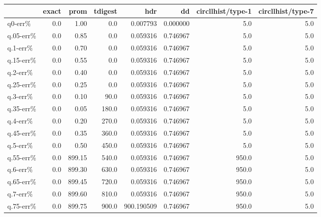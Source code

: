\begin{tabular}{lrrrrrrr}
\toprule
{} &  exact &    prom &  tdigest &         hdr &        dd &  circllhist/type-1 &  circllhist/type-7 \\
\midrule
q0-err\%   &    0.0 &    1.00 &      0.0 &    0.007793 &  0.000000 &                5.0 &                5.0 \\
q.05-err\% &    0.0 &    0.85 &      0.0 &    0.059316 &  0.746967 &                5.0 &                5.0 \\
q.1-err\%  &    0.0 &    0.70 &      0.0 &    0.059316 &  0.746967 &                5.0 &                5.0 \\
q.15-err\% &    0.0 &    0.55 &      0.0 &    0.059316 &  0.746967 &                5.0 &                5.0 \\
q.2-err\%  &    0.0 &    0.40 &      0.0 &    0.059316 &  0.746967 &                5.0 &                5.0 \\
q.25-err\% &    0.0 &    0.25 &      0.0 &    0.059316 &  0.746967 &                5.0 &                5.0 \\
q.3-err\%  &    0.0 &    0.10 &     90.0 &    0.059316 &  0.746967 &                5.0 &                5.0 \\
q.35-err\% &    0.0 &    0.05 &    180.0 &    0.059316 &  0.746967 &                5.0 &                5.0 \\
q.4-err\%  &    0.0 &    0.20 &    270.0 &    0.059316 &  0.746967 &                5.0 &                5.0 \\
q.45-err\% &    0.0 &    0.35 &    360.0 &    0.059316 &  0.746967 &                5.0 &                5.0 \\
q.5-err\%  &    0.0 &    0.50 &    450.0 &    0.059316 &  0.746967 &                5.0 &                5.0 \\
q.55-err\% &    0.0 &  899.15 &    540.0 &    0.059316 &  0.746967 &              950.0 &                5.0 \\
q.6-err\%  &    0.0 &  899.30 &    630.0 &    0.059316 &  0.746967 &              950.0 &                5.0 \\
q.65-err\% &    0.0 &  899.45 &    720.0 &    0.059316 &  0.746967 &              950.0 &                5.0 \\
q.7-err\%  &    0.0 &  899.60 &    810.0 &    0.059316 &  0.746967 &              950.0 &                5.0 \\
q.75-err\% &    0.0 &  899.75 &    900.0 &  900.190509 &  0.746967 &              950.0 &                5.0 \\

\end{tabular}
